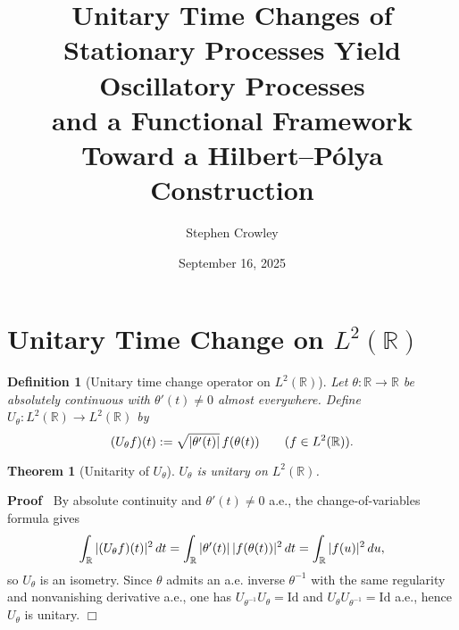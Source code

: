 \documentclass{article}
\newcommand{\assign}{:=}
\newenvironment{proof}{\noindent\textbf{Proof\ }}{\hspace*{\fill}$\Box$\medskip}
\newtheorem{definition}{Definition}
\newtheorem{theorem}{Theorem}
\begin{document}
\title{
  Unitary Time Changes of Stationary Processes Yield Oscillatory Processes\\
  and a Functional Framework Toward a Hilbert--P{\'o}lya Construction
}

\author{Stephen Crowley}

\date{September 16, 2025}

\maketitle

{\tableofcontents}

\section{Unitary Time Change on $L^2 (\mathbb{R})$}

\begin{definition}
  [Unitary time change operator on $L^2 (\mathbb{R})$] Let $\theta :
  \mathbb{R} \to \mathbb{R}$ be absolutely continuous with $\theta' (t) \neq
  0$ almost everywhere. Define $U_{\theta} : L^2 (\mathbb{R}) \to L^2
  (\mathbb{R})$ by
  \begin{equation}
    (U_{\theta} f) (t) \assign \sqrt{| \theta' (t) |}  \hspace{0.17em} f
    (\theta (t))  \qquad (f \in L^2 (\mathbb{R})) .
  \end{equation}
\end{definition}

\begin{theorem}
  [Unitarity of $U_{\theta}$] $U_{\theta}$ is unitary on $L^2 (\mathbb{R})$.
\end{theorem}

\begin{proof}
  By absolute continuity and $\theta' (t) \neq 0$ a.e., the
  change-of-variables formula gives
  \[ \int_{\mathbb{R}} | (U_{\theta} f) (t) |^2 \hspace{0.17em} dt =
     \int_{\mathbb{R}} | \theta' (t) | \hspace{0.17em} |f (\theta (t)) |^2
     \hspace{0.17em} dt = \int_{\mathbb{R}} |f (u) |^2  \hspace{0.17em} du, \]
  so $U_{\theta}$ is an isometry. Since $\theta$ admits an a.e. inverse
  $\theta^{- 1}$ with the same regularity and nonvanishing derivative a.e.,
  one has $U_{\theta^{- 1}} U_{\theta} = \mathrm{Id}$ and $U_{\theta}
  U_{\theta^{- 1}} = \mathrm{Id}$ a.e., hence $U_{\theta}$ is unitary.
\end{proof}
\end{document}
